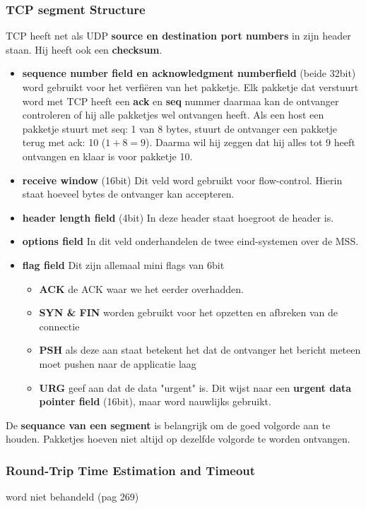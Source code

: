 \subsubsection{TCP segment Structure}
TCP heeft net als UDP \textbf{source en destination port numbers} in zijn header staan. Hij heeft ook een
\textbf{checksum}.
\newline
\begin{itemize}
    \item \textbf{sequence number field en acknowledgment numberfield} (beide 32bit) word gebruikt voor het verfiëren
    van het
    pakketje. Elk pakketje dat verstuurt word met TCP heeft een \textbf{ack} en \textbf{seq} nummer daarmaa kan de
    ontvanger controleren of hij alle pakketjes wel ontvangen heeft. Als een host een pakketje stuurt met seq: 1 van
    8 bytes, stuurt de ontvanger een pakketje terug met ack: 10 ($1 + 8 = 9$). Daarma wil hij zeggen dat hij alles
    tot 9 heeft ontvangen en klaar is voor pakketje 10.
    \item \textbf{receive window} (16bit) Dit veld word gebruikt voor flow-control. Hierin staat hoeveel bytes de
    ontvanger kan accepteren.
    \item \textbf{header length field} (4bit) In deze header staat hoegroot de header is.
    \item \textbf{options field} In dit veld onderhandelen de twee eind-systemen over de MSS.
    \item \textbf{flag field} Dit zijn allemaal mini flags van 6bit
        \begin{itemize}
            \item \textbf{ACK} de ACK waar we het eerder overhadden.
            \item \textbf{SYN \& FIN} worden gebruikt voor het opzetten en afbreken van de connectie
            \item \textbf{PSH} als deze aan staat betekent het dat de ontvanger het bericht meteen moet pushen naar
            de applicatie laag
            \item \textbf{URG} geef aan dat de data "urgent" is. Dit wijst naar een \textbf{urgent data pointer
            field} (16bit), maar word nauwlijks gebruikt.
        \end{itemize}
\end{itemize}
De \textbf{sequance van een segment} is belangrijk om de goed volgorde aan te houden. Pakketjes hoeven niet altijd op
dezelfde volgorde te worden ontvangen.

\subsubsection{Round-Trip Time Estimation and Timeout}
word niet behandeld (pag 269)
